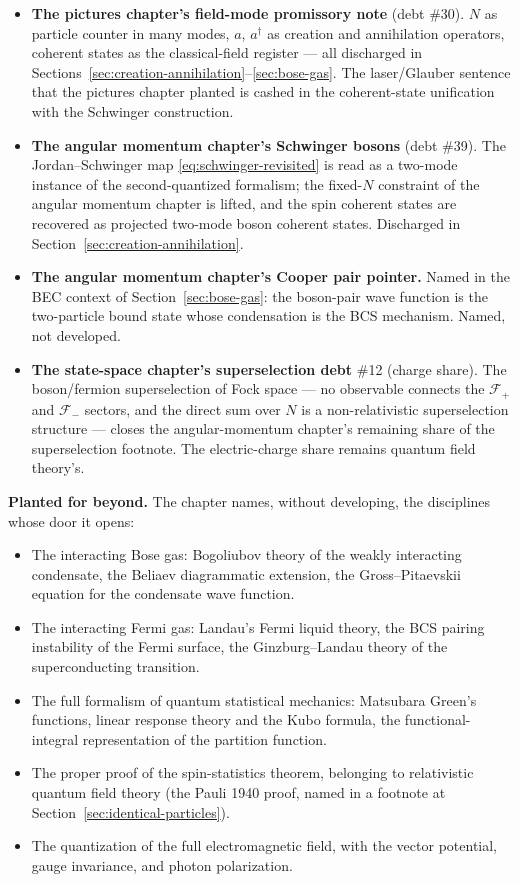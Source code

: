 \begin{itemize}
    \item \textbf{The pictures chapter's field-mode promissory note} (debt \#30). $N$ as particle counter in many modes, $a$, $a^\dagger$ as creation and annihilation operators, coherent states as the classical-field register --- all discharged in Sections~\ref{sec:creation-annihilation}--\ref{sec:bose-gas}. The laser/Glauber sentence that the pictures chapter planted is cashed in the coherent-state unification with the Schwinger construction.

    \item \textbf{The angular momentum chapter's Schwinger bosons} (debt \#39). The Jordan--Schwinger map \eqref{eq:schwinger-revisited} is read as a two-mode instance of the second-quantized formalism; the fixed-$N$ constraint of the angular momentum chapter is lifted, and the spin coherent states are recovered as projected two-mode boson coherent states. Discharged in Section~\ref{sec:creation-annihilation}.

    \item \textbf{The angular momentum chapter's Cooper pair pointer.} Named in the BEC context of Section~\ref{sec:bose-gas}: the boson-pair wave function is the two-particle bound state whose condensation is the BCS mechanism. Named, not developed.

    \item \textbf{The state-space chapter's superselection debt} \#12 (charge share). The boson/fermion superselection of Fock space --- no observable connects the $\mathcal{F}_+$ and $\mathcal{F}_-$ sectors, and the direct sum over $N$ is a non-relativistic superselection structure --- closes the angular-momentum chapter's remaining share of the superselection footnote. The electric-charge share remains quantum field theory's.
\end{itemize}

\medskip\noindent\textbf{Planted for beyond.}
The chapter names, without developing, the disciplines whose door it opens:

\begin{itemize}
    \item The interacting Bose gas: Bogoliubov theory of the weakly interacting condensate, the Beliaev diagrammatic extension, the Gross--Pitaevskii equation for the condensate wave function.
    \item The interacting Fermi gas: Landau's Fermi liquid theory, the BCS pairing instability of the Fermi surface, the Ginzburg--Landau theory of the superconducting transition.
    \item The full formalism of quantum statistical mechanics: Matsubara Green's functions, linear response theory and the Kubo formula, the functional-integral representation of the partition function.
    \item The proper proof of the spin-statistics theorem, belonging to relativistic quantum field theory (the Pauli 1940 proof, named in a footnote at Section~\ref{sec:identical-particles}).
    \item The quantization of the full electromagnetic field, with the vector potential, gauge invariance, and photon polarization.
\end{itemize}


